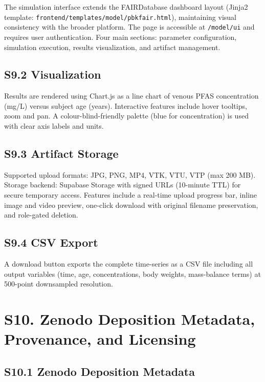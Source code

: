 \documentclass[12pt]{article}
\begin{document}
The simulation interface extends the FAIRDatabase dashboard layout
(Jinja2 template: \texttt{frontend/templates/model/pbkfair.html}),
maintaining visual consistency with the broader platform. The page is
accessible at \texttt{/model/ui} and requires user authentication.
Four main sections: parameter configuration, simulation execution,
results visualization, and artifact management.

\subsection*{S9.2 Visualization}

Results are rendered using Chart.js as a line chart of venous PFAS
concentration (mg/L) versus subject age (years). Interactive features
include hover tooltips, zoom and pan. A colour-blind-friendly palette
(blue for concentration) is used with clear axis labels and units.

\subsection*{S9.3 Artifact Storage}

Supported upload formats: JPG, PNG, MP4, VTK, VTU, VTP (max 200 MB).
Storage backend: Supabase Storage with signed URLs (10-minute TTL)
for secure temporary access. Features include a real-time upload
progress bar, inline image and video preview, one-click download with
original filename preservation, and role-gated deletion.

\subsection*{S9.4 CSV Export}

A download button exports the complete time-series as a CSV file
including all output variables (time, age, concentrations, body
weights, mass-balance terms) at 500-point downsampled resolution.

\section*{S10. Zenodo Deposition Metadata, Provenance, and Licensing}


\subsection*{S10.1 Zenodo Deposition Metadata}
\end{document}
